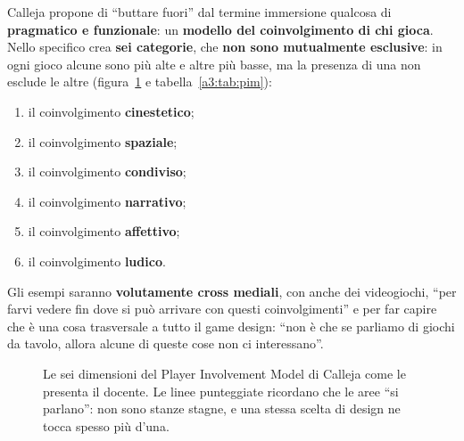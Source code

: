 Calleja propone di ``buttare fuori'' dal termine immersione qualcosa di
\textbf{pragmatico e funzionale}: un \textbf{modello del coinvolgimento di chi
gioca}. Nello specifico crea \textbf{sei categorie}, che \textbf{non sono
mutualmente esclusive}: in ogni gioco alcune sono più alte e altre più basse, ma
la presenza di una non esclude le altre
(figura~\ref{a3:fig:pim} e tabella~\ref{a3:tab:pim}):
\begin{enumerate}
  \item il coinvolgimento \textbf{cinestetico};
  \item il coinvolgimento \textbf{spaziale};
  \item il coinvolgimento \textbf{condiviso};
  \item il coinvolgimento \textbf{narrativo};
  \item il coinvolgimento \textbf{affettivo};
  \item il coinvolgimento \textbf{ludico}.
\end{enumerate}
Gli esempi saranno \textbf{volutamente cross mediali}, con anche dei videogiochi,
``per farvi vedere fin dove si può arrivare con questi coinvolgimenti'' e per
far capire che è una cosa trasversale a tutto il game design: ``non è che se
parliamo di giochi da tavolo, allora alcune di queste cose non ci interessano''.

\begin{figure}[htbp]
\centering
{}
\caption{Le sei dimensioni del Player Involvement Model di Calleja come le
presenta il docente. Le linee punteggiate ricordano che le aree ``si parlano'':
non sono stanze stagne, e una stessa scelta di design ne tocca spesso più
d'una.}
\label{a3:fig:pim}
\end{figure}

